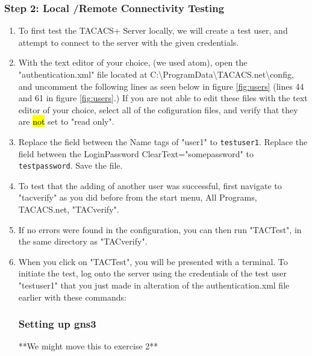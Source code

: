 \documentclass[main.tex]{subfiles}
\begin{document}
\subsubsection{Step 2: Local /Remote Connectivity Testing} 
\begin{enumerate}[noitemsep,label=$\bullet$,leftmargin=20mm,labelsep=0.5cm]
\item To first test the TACACS+ Server locally, we will create a test user, and attempt to connect to the server with the given credentials. 

\item With the text editor of your choice, (we used atom), open the "authentication.xml" file located at C:\textbackslash ProgramData\textbackslash TACACS.net\textbackslash config, and uncomment the following lines as seen below in figure \ref{fig:users} (lines 44 and 61 in figure \ref{fig:users}.) If you are not able to edit these files with the text editor of your choice, select all of the cofiguration files, and verify that they are \hl{not} set to "read only".

\item Replace the field between the Name tags of "user1" to \texttt{testuser1}. Replace the field between the LoginPassword ClearText="somepassword" to \texttt{testpassword}. Save the file.

\item To test that the adding of another user was successful, first navigate to "tacverify" as you did before from the start menu, All Programs, TACACS.net, "TACverify".
\item If no errors were found in the configuration, you can then run "TACTest", in the same directory as "TACverify".
\vspace{3mm}
\item When you click on "TACTest", you will be presented with a terminal. To initiate the test, log onto the server using the credentials of the test user "testuser1" that you just made in alteration of the authentication.xml file earlier with these commands:


\subsubsection{Setting up gns3}

**We might move this to exercise 2**


\end{enumerate}
\end{document}
